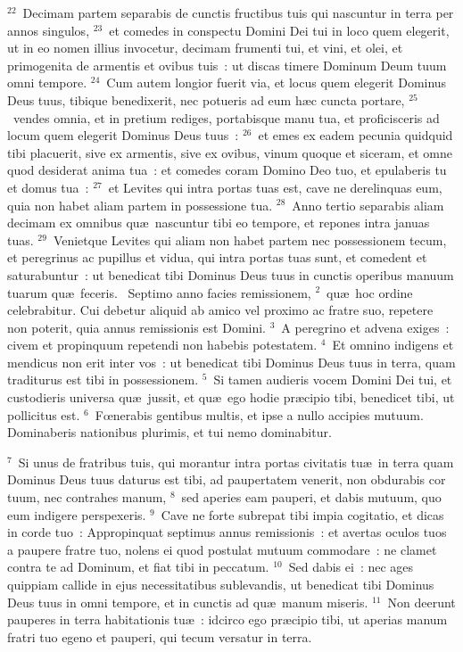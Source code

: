 ${}^{22}$~Decimam partem separabis de cunctis fructibus tuis qui nascuntur in terra per annos singulos,
${}^{23}$~et comedes in conspectu Domini Dei tui in loco quem elegerit, ut in eo nomen illius invocetur, decimam frumenti tui, et vini, et olei, et primogenita de armentis et ovibus tuis~: ut discas timere Dominum Deum tuum omni tempore.
${}^{24}$~Cum autem longior fuerit via, et locus quem elegerit Dominus Deus tuus, tibique benedixerit, nec potueris ad eum h\ae c cuncta portare,
${}^{25}$~vendes omnia, et in pretium rediges, portabisque manu tua, et proficisceris ad locum quem elegerit Dominus Deus tuus~:
${}^{26}$~et emes ex eadem pecunia quidquid tibi placuerit, sive ex armentis, sive ex ovibus, vinum quoque et siceram, et omne quod desiderat anima tua~: et comedes coram Domino Deo tuo, et epulaberis tu et domus tua~:
${}^{27}$~et Levites qui intra portas tuas est, cave ne derelinquas eum, quia non habet aliam partem in possessione tua.
${}^{28}$~Anno tertio separabis aliam decimam ex omnibus qu\ae\ nascuntur tibi eo tempore, et repones intra januas tuas.
${}^{29}$~Venietque Levites qui aliam non habet partem nec possessionem tecum, et peregrinus ac pupillus et vidua, qui intra portas tuas sunt, et comedent et saturabuntur~: ut benedicat tibi Dominus Deus tuus in cunctis operibus manuum tuarum qu\ae\ feceris.
~\lettrine[lines=10,image=true,loversize=0.05,lraise=-0.03]{S}{}eptimo anno facies remissionem,
${}^{2}$~qu\ae\ hoc ordine celebrabitur. Cui debetur aliquid ab amico vel proximo ac fratre suo, repetere non poterit, quia annus remissionis est Domini.
${}^{3}$~A peregrino et advena exiges~: civem et propinquum repetendi non habebis potestatem.
${}^{4}$~Et omnino indigens et mendicus non erit inter vos~: ut benedicat tibi Dominus Deus tuus in terra, quam traditurus est tibi in possessionem.
${}^{5}$~Si tamen audieris vocem Domini Dei tui, et custodieris universa qu\ae\ jussit, et qu\ae\ ego hodie pr\ae cipio tibi, benedicet tibi, ut pollicitus est.
${}^{6}$~Fœnerabis gentibus multis, et ipse a nullo accipies mutuum. Dominaberis nationibus plurimis, et tui nemo dominabitur.


${}^{7}$~Si unus de fratribus tuis, qui morantur intra portas civitatis tu\ae\ in terra quam Dominus Deus tuus daturus est tibi, ad paupertatem venerit, non obdurabis cor tuum, nec contrahes manum,
${}^{8}$~sed aperies eam pauperi, et dabis mutuum, quo eum indigere perspexeris.
${}^{9}$~Cave ne forte subrepat tibi impia cogitatio, et dicas in corde tuo~: Appropinquat septimus annus remissionis~: et avertas oculos tuos a paupere fratre tuo, nolens ei quod postulat mutuum commodare~: ne clamet contra te ad Dominum, et fiat tibi in peccatum.
${}^{10}$~Sed dabis ei~: nec ages quippiam callide in ejus necessitatibus sublevandis, ut benedicat tibi Dominus Deus tuus in omni tempore, et in cunctis ad qu\ae\ manum miseris.
${}^{11}$~Non deerunt pauperes in terra habitationis tu\ae~: idcirco ego pr\ae cipio tibi, ut aperias manum fratri tuo egeno et pauperi, qui tecum versatur in terra.


